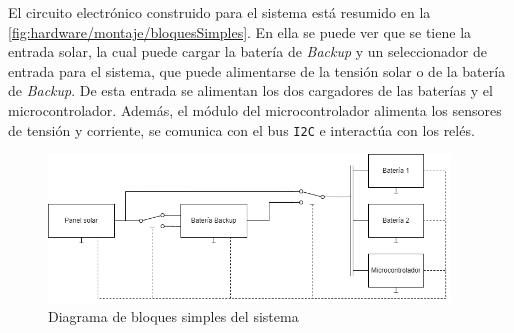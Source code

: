El circuito electrónico construido para el sistema está resumido en la \autoref{fig:hardware/montaje/bloquesSimples}. En ella se puede ver que se tiene la entrada solar, la cual puede cargar la batería de \textit{Backup} y un seleccionador de entrada para el sistema, que puede alimentarse de la tensión solar o de la batería de \textit{Backup}. De esta entrada se alimentan los dos cargadores de las baterías y el microcontrolador. Además, el módulo del microcontrolador alimenta los sensores de tensión y corriente, se comunica con el bus \texttt{I2C} e interactúa con los relés.

\begin{figure}[H]
    \centering
    \includegraphics[width=0.95\textwidth]{images/2-hardware/bloquesSimples.png}
    \caption{Diagrama de bloques simples del sistema}
    \label{fig:hardware/montaje/bloquesSimples}
\end{figure}